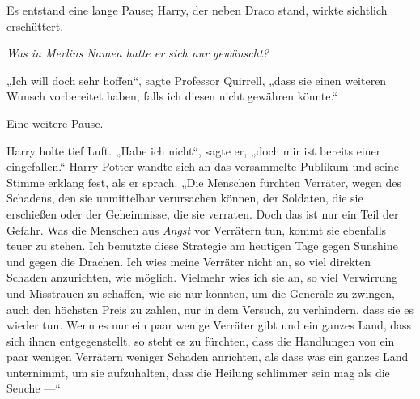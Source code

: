 Es entstand eine lange Pause; Harry, der neben Draco stand, wirkte sichtlich erschüttert.

\emph{Was in Merlins Namen hatte er sich nur gewünscht?}

„Ich will doch sehr hoffen“, sagte Professor Quirrell, „dass sie einen weiteren Wunsch vorbereitet haben, falls ich diesen nicht gewähren könnte.“

Eine weitere Pause.

Harry holte tief Luft.
„Habe ich nicht“, sagte er, „doch mir ist bereits einer eingefallen.“ Harry Potter wandte sich an das versammelte Publikum und seine Stimme erklang fest, als er sprach.
„Die Menschen fürchten Verräter, wegen des Schadens, den sie unmittelbar verursachen können, der Soldaten, die sie erschießen oder der Geheimnisse, die sie verraten. Doch das ist nur ein Teil der Gefahr. Was die Menschen aus \emph{Angst} vor Verrätern tun, kommt sie ebenfalls teuer zu stehen. Ich benutzte diese Strategie am heutigen Tage gegen Sunshine und gegen die Drachen. Ich wies meine Verräter nicht an, so viel direkten Schaden anzurichten, wie möglich. Vielmehr wies ich sie an, so viel Verwirrung und Misstrauen zu schaffen, wie sie nur konnten, um die Generäle zu zwingen, auch den höchsten Preis zu zahlen, nur in dem Versuch, zu verhindern, dass sie es wieder tun. Wenn es nur ein paar wenige Verräter gibt und ein ganzes Land, dass sich ihnen entgegenstellt, so steht es zu fürchten, dass die Handlungen von ein paar wenigen Verrätern weniger Schaden anrichten, als dass was ein ganzes Land unternimmt, um sie aufzuhalten, dass die Heilung schlimmer sein mag als die Seuche —“

